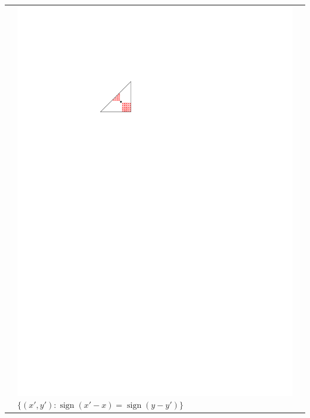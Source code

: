 \documentclass{patmorin}
\DeclareMathOperator{\sign}{sign}
\begin{document}
\begin{table}
\begin{center}
\begin{tabular}{m{1ex}|>{\centering\arraybackslash}m{}|>{\centering\arraybackslash}m{}}
         &  \includegraphics[scale=.8]{figs/killersb-4} \break%
            $\{(x',y'):\sign(x'-x)=\sign(y-y')\}$ \\

\end{tabular}
\end{center}
\end{table}
\end{document}
